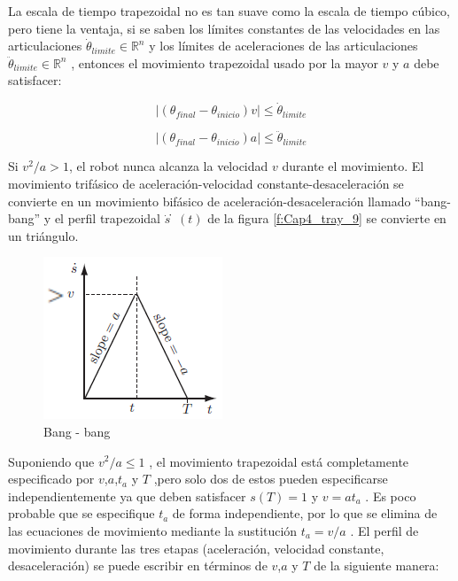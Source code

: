         La escala de tiempo trapezoidal no es tan suave como la escala de tiempo cúbico, pero tiene la ventaja, si se saben los límites constantes de las velocidades en las articulaciones  ${\dot{\theta}}_{limite} \in {\mathbb{R}}^n $   y los límites de aceleraciones de las articulaciones ${\ddot{\theta}}_{limite} \in {\mathbb{R}}^n $  , entonces el movimiento trapezoidal usado por la mayor $v$ y $a$  debe satisfacer:
        
        \begin{equation}
             \left| ({\theta}_{final}-{\theta}_{inicio})v \right|   \leq {\dot{\theta}}_{limite}
            \label{eq:cap4_tray_28}
        \end{equation}
        
        \begin{equation}
             \left| ({\theta}_{final}-{\theta}_{inicio})a \right|   \leq {\ddot{\theta}}_{limite}
            \label{eq:cap4_tray_29}
        \end{equation}
        
        Si ${v^2}/a > 1$, el robot nunca alcanza la velocidad $v$  durante el movimiento. El movimiento trifásico de aceleración-velocidad constante-desaceleración se convierte en un movimiento bifásico de aceleración-desaceleración llamado “bang-bang” y el perfil trapezoidal $\dot{s}̇(t)$ de la figura \ref{f:Cap4_tray_9} se convierte en un triángulo.
        
        \begin{figure}[htb]
                \centering
                \includegraphics[width=0.3\linewidth]{Main/Chapter4/Images4/cap4_tray_10.png}
                \caption{Bang - bang \cite{moder_robot}}
                \label{f:Cap4_tray_10}
            \end{figure} 
    
    
            \newpage

        Suponiendo que ${v^2}/a \leq 1$ , el movimiento trapezoidal está completamente especificado por $v$,$a$,$t_a$ y  $T$ ,pero solo dos de estos pueden especificarse independientemente ya que deben satisfacer $s(T)=1$  y $v=at_a$ . Es poco probable que se especifique  $t_a$  de forma independiente, por lo que se elimina de las ecuaciones de movimiento mediante la sustitución ${t}_{a}=v/a$ . El perfil de movimiento durante las tres etapas (aceleración, velocidad constante, desaceleración) se puede escribir en términos de $v$,$a$ y $T$ de la siguiente manera:
        
